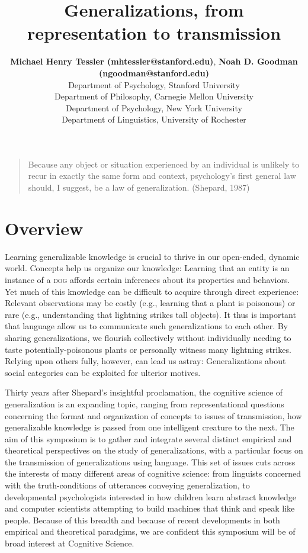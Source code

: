 \documentclass[10pt,letterpaper]{article}
\title{Generalizations, from representation to transmission}
\author{{\large \bf Michael Henry Tessler (mhtessler@stanford.edu)}, {\large \bf Noah D. Goodman (ngoodman@stanford.edu)}  \\
  Department of Psychology, Stanford University
   \AND {\large \bf David Danks (ddanks@cmu.edu)} \\
  Department of Philosophy, Carnegie Mellon University
    \AND {\large \bf Marjorie Rhodes (marjorie.rhodes@nyu.edu)} \\
  Department of Psychology, New York University
    \AND {\large \bf Gregory Carlson (calrson@ling.rochester.edu)} \\
  Department of Linguistics, University of Rochester
  }
\begin{document}
\maketitle



\begin{quote}
Because any object or situation experienced by an individual is unlikely to recur in exactly the same form and context, psychology's first general law should, I suggest, be a law of generalization.  (Shepard, 1987)
\end{quote}

\section{Overview}

Learning generalizable knowledge is crucial to thrive in our open-ended, dynamic world. 
Concepts help us organize our knowledge: Learning that an entity is an instance of a \textsc{dog} affords certain inferences about its properties and behaviors.
Yet much of this knowledge can be difficult to acquire through direct experience: Relevant observations may be costly (e.g., learning that a plant is poisonous) or rare (e.g., understanding that lightning strikes tall objects). 
It thus is important that language allow us to communicate such generalizations to each other. 
By sharing generalizations, we flourish collectively without individually needing to taste potentially-poisonous plants or personally witness many lightning strikes.
Relying upon others fully, however, can lead us astray: Generalizations about social categories can be exploited for ulterior motives. 

Thirty years after Shepard's insightful proclamation, the cognitive science of generalization is an expanding topic, ranging from representational questions concerning the format and organization of concepts to issues of transmission, how generalizable knowledge is passed from one intelligent creature to the next. 
The aim of this symposium is to gather and integrate several distinct empirical and theoretical perspectives on the study of generalizations, with a particular focus on the transmission of generalizations using language.
This set of issues cuts across the interests of many different areas of cognitive science: from linguists concerned with the truth-conditions of utterances conveying generalization, to developmental psychologists interested in how children learn abstract knowledge and computer scientists attempting to build machines that think and speak like people. 
Because of this breadth and because of recent developments in both empirical and theoretical paradgims, we are confident this symposium will be of broad interest at Cognitive Science.
\end{document}
